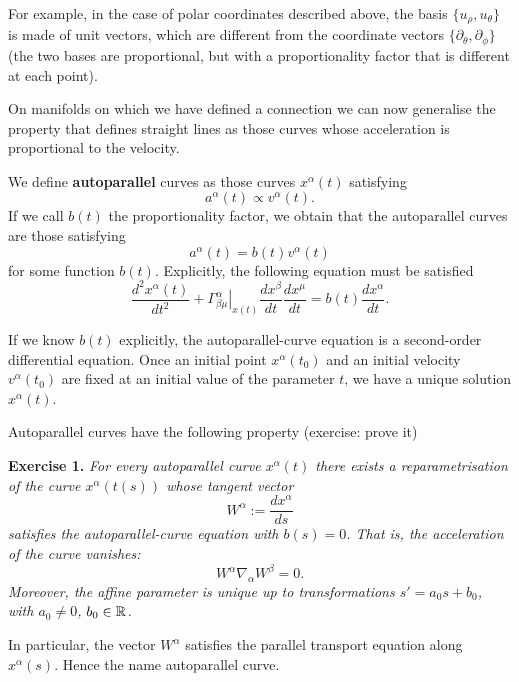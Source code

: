 \begin{points}
\item For example, in the case of polar coordinates described above, the basis $\{u_\rho,u_\theta\}$ is made of unit vectors, which are different from the coordinate vectors $\{\partial_\theta,\partial_\phi\}$ (the two bases are proportional, but with a proportionality factor that is different at each point).

\item On manifolds on which we have defined a connection we can now generalise the property that defines straight lines as those curves whose acceleration is proportional to the velocity.

\item We define \textbf{autoparallel} curves as those curves $x^\alpha(t)$ satisfying
\[
  a^\alpha(t)\propto v^\alpha(t).
\]
If we call $b(t)$ the proportionality factor, we obtain that the autoparallel curves are those satisfying
\[
  a^\alpha(t)=b(t)v^\alpha(t)
\]
for some function $b(t)$. Explicitly, the following equation must be satisfied
\[
  \frac{d^2x^\alpha(t)}{dt^2}+\left.\Gamma^\alpha_{\beta\mu}\right|_{x(t)}\frac{dx^\beta}{dt}\frac{dx^\mu}{dt}=b(t)\frac{dx^\alpha}{dt}.
\]

\item If we know $b(t)$ explicitly, the autoparallel-curve equation is a second-order differential equation. Once an initial point $x^\alpha(t_0)$ and an initial velocity $v^\alpha(t_0)$ are fixed at an initial value of the parameter $t$, we have a unique solution $x^\alpha(t)$.

\item Autoparallel curves have the following property (exercise: prove it)
\end{points}

\textbf{Exercise 1.} \emph{For every autoparallel curve $x^\alpha(t)$ there exists a reparametrisation of the curve $x^\alpha(t(s))$ whose tangent vector
\[
  W^\alpha:=\frac{dx^\alpha}{ds}
\]
satisfies the autoparallel-curve equation with $b(s)=0$. That is, the acceleration of the curve vanishes:
\[
  W^\alpha\nabla_\alpha W^\beta=0.
\]
Moreover, the affine parameter is unique up to transformations $s'=a_0s+b_0$, with $a_0\neq0$, $b_0\in\mathbb{R}$.}

\begin{points}
\item In particular, the vector $W^\alpha$ satisfies the parallel transport equation along $x^\alpha(s)$. Hence the name autoparallel curve.
\end{points}


